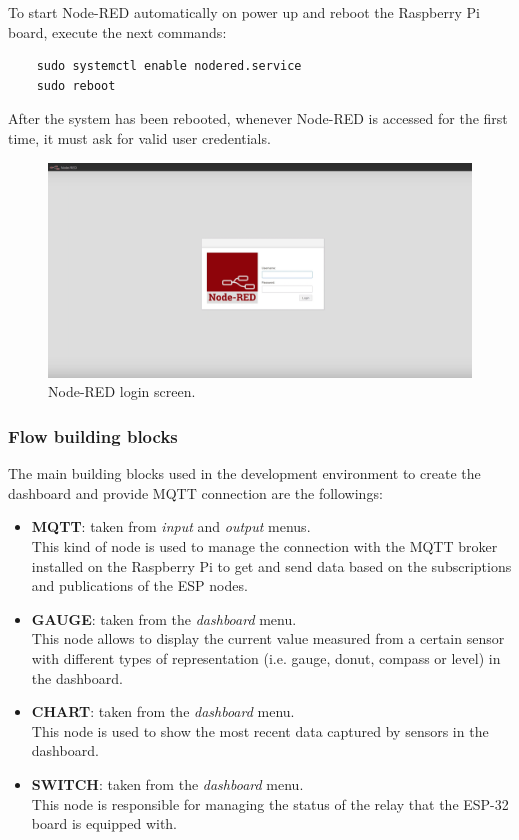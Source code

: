 \noindent
To start Node-RED automatically on power up and reboot the Raspberry Pi board, execute the next commands:

\begin{verbatim}
    sudo systemctl enable nodered.service
    sudo reboot
\end{verbatim}

\noindent
After the system has been rebooted, whenever Node-RED is accessed for the first time, it must ask for valid user credentials.

\begin{figure}[H]
	\begin{center}
		\includegraphics[width=1.0\textwidth]{./pictures/node-red-UI-login}
		\caption{Node-RED login screen.}
		\label{credentials_ui}
	\end{center}
\end{figure}

\subsubsection{Flow building blocks}
The main building blocks used in the development environment to create the dashboard and provide MQTT connection are the followings:

\begin{itemize}
    \item \textbf{MQTT}: taken from \textit{input} and \textit{output} menus.\\
    This kind of node is used to manage the connection with the MQTT broker installed on the Raspberry Pi to get and send data based on the subscriptions and publications of the ESP nodes.
    \item \textbf{GAUGE}: taken from the \textit{dashboard} menu.\\
    This node allows to display the current value measured from a certain sensor with different types of representation (i.e. gauge, donut, compass or level) in the dashboard.
    \item \textbf{CHART}: taken from the \textit{dashboard} menu.\\
    This node is used to show the most recent data captured by sensors in the dashboard.
    \item \textbf{SWITCH}: taken from the \textit{dashboard} menu.\\
    This node is responsible for managing the status of the relay that the ESP-32 board is equipped with.
\end{itemize}

